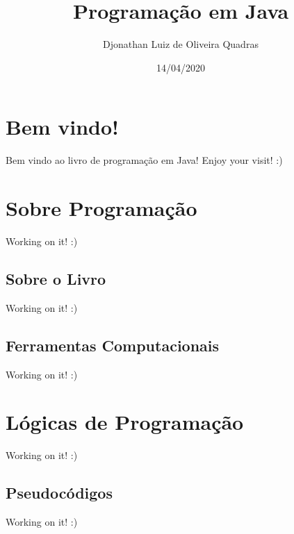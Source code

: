 \documentclass[
]{book}
\title{Programação em Java}
\author{Djonathan Luiz de Oliveira Quadras}
\date{14/04/2020}
\begin{document}
\maketitle

{
\setcounter{tocdepth}{1}
\tableofcontents
}
\hypertarget{bem-vindo}{%
\chapter*{Bem vindo!}\label{bem-vindo}}

Bem vindo ao livro de programação em Java! Enjoy your visit! :)

\hypertarget{sobre-programauxe7uxe3o}{%
\chapter*{Sobre Programação}\label{sobre-programauxe7uxe3o}}

Working on it! :)

\hypertarget{sobre-o-livro}{%
\section*{Sobre o Livro}\label{sobre-o-livro}}

Working on it! :)

\hypertarget{ferramentas-computacionais}{%
\section*{Ferramentas Computacionais}\label{ferramentas-computacionais}}

Working on it! :)

\hypertarget{luxf3gicas-de-programauxe7uxe3o}{%
\chapter{Lógicas de Programação}\label{luxf3gicas-de-programauxe7uxe3o}}

Working on it! :)

\hypertarget{pseudocuxf3digos}{%
\section{Pseudocódigos}\label{pseudocuxf3digos}}

Working on it! :)
\end{document}
